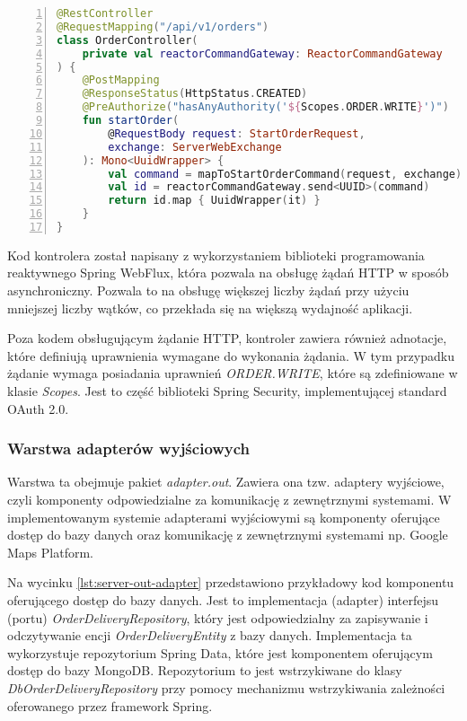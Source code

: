 \begin{lstlisting}[caption={Kod kontrolera REST API obsługującego zapytania dotyczące zamówień},label={lst:server-in-adapter},captionpos=b,language=Kotlin,numbers=left]
@RestController
@RequestMapping("/api/v1/orders")
class OrderController(
    private val reactorCommandGateway: ReactorCommandGateway
) {
    @PostMapping
    @ResponseStatus(HttpStatus.CREATED)
    @PreAuthorize("hasAnyAuthority('${Scopes.ORDER.WRITE}')")
    fun startOrder(
        @RequestBody request: StartOrderRequest,
        exchange: ServerWebExchange
    ): Mono<UuidWrapper> {
        val command = mapToStartOrderCommand(request, exchange)
        val id = reactorCommandGateway.send<UUID>(command)
        return id.map { UuidWrapper(it) }
    }
}
\end{lstlisting}

Kod kontrolera został napisany z wykorzystaniem biblioteki programowania reaktywnego Spring WebFlux, która pozwala na obsługę żądań HTTP w sposób asynchroniczny. Pozwala to na obsługę większej liczby żądań przy użyciu mniejszej liczby wątków, co przekłada się na większą wydajność aplikacji.

Poza kodem obsługującym żądanie HTTP, kontroler zawiera również adnotacje, które definiują uprawnienia wymagane do wykonania żądania. W tym przypadku żądanie wymaga posiadania uprawnień \textit{ORDER.WRITE}, które są zdefiniowane w klasie \textit{Scopes}. Jest to część biblioteki Spring Security, implementującej standard OAuth 2.0.

\subsubsection{Warstwa adapterów wyjściowych} 

Warstwa ta obejmuje pakiet \textit{adapter.out}. Zawiera ona tzw. adaptery wyjściowe, czyli komponenty odpowiedzialne za komunikację z zewnętrznymi systemami. W implementowanym systemie adapterami wyjściowymi są komponenty oferujące dostęp do bazy danych oraz komunikację z zewnętrznymi systemami np. Google Maps Platform.

Na wycinku \ref{lst:server-out-adapter} przedstawiono przykładowy kod komponentu oferującego dostęp do bazy danych. Jest to implementacja (adapter) interfejsu (portu) \textit{OrderDeliveryRepository}, który jest odpowiedzialny za zapisywanie i odczytywanie encji \textit{OrderDeliveryEntity} z bazy danych. Implementacja ta wykorzystuje repozytorium Spring Data, które jest komponentem oferującym dostęp do bazy MongoDB. Repozytorium to jest wstrzykiwane do klasy \textit{DbOrderDeliveryRepository} przy pomocy mechanizmu wstrzykiwania zależności oferowanego przez framework Spring. 

